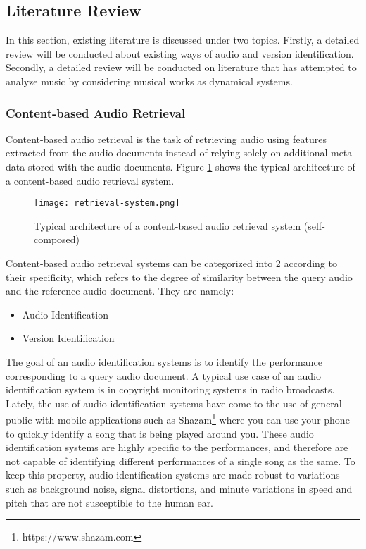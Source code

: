 \documentclass[../main.tex]{subfiles}
\begin{document}
\subsection{Literature Review}

In this section, existing literature is discussed under two topics. Firstly, a detailed review will be conducted about existing ways of audio and version identification. Secondly, a detailed review will be conducted on literature that has attempted to analyze music by considering musical works as dynamical systems. 

\subsubsection{Content-based Audio Retrieval}

\par
Content-based audio retrieval is the task of retrieving audio using features extracted from the audio documents instead of relying solely on additional meta-data stored with the audio documents. Figure \ref{fig:retrieval-system} shows the typical architecture of a content-based audio retrieval system.

\begin{figure}[h]
    \centering
    \texttt{[image: retrieval-system.png]}
    \caption{Typical architecture of a content-based audio retrieval system (self-composed)}
    \label{fig:retrieval-system}
\end{figure}

\par
Content-based audio retrieval systems can be categorized into 2 according to their specificity, which refers to the degree of similarity between the query audio and the reference audio document. They are namely:
\begin{itemize}
    \item Audio Identification
    \item Version Identification
\end{itemize}

\par
The goal of an audio identification systems is to identify the performance corresponding to a query audio document. A typical use case of an audio identification system is in copyright monitoring systems in radio broadcasts. Lately, the use of audio identification systems have come to the use of general public with mobile applications such as Shazam\footnote{https://www.shazam.com} where you can use your phone to quickly identify a song that is being played around you. These audio identification systems are highly specific to the performances, and therefore are not capable of identifying different performances of a single song as the same. To keep this property, audio identification systems are made robust to variations such as background noise, signal distortions, and minute variations in speed and pitch that are not susceptible to the human ear.
\end{document}
